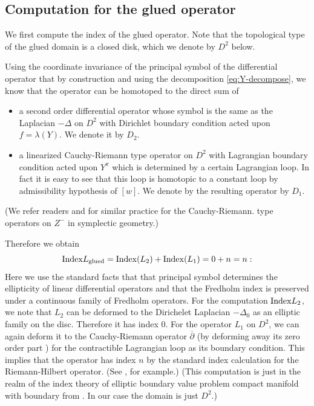 \documentclass[reqno]{amsart}
\theoremstyle{theorem}
\theoremstyle{definition}
\numberwithin{equation}{section}
\def\delbar{{\overline \partial}}
\def\delbar{{\overline \partial}}
\begin{document}
\subsection{Computation for the glued operator}

We first compute the index of the glued operator. Note that the topological type of
the glued domain is a closed disk, which we denote by $D^2$ below.

Using the coordinate invariance of the principal symbol of the differential operator
that by construction and using the decomposition \eqref{eq:Y-decompose}, we know that
the operator can be homotoped to the direct sum of
\begin{itemize}
\item a second order differential operator whose symbol is
the same as the Laplacian $-\Delta$ on $D^2$ with Dirichlet boundary condition acted upon
$f = \lambda(Y)$. We denote it by $D_2$.
\item a linearized Cauchy-Riemann type operator  on $D^2$ with Lagrangian boundary condition
acted upon $Y^\pi$ which is determined by a certain Lagrangian loop.
In fact it is easy to see that this loop is homotopic
to a constant loop by admissibility hypothesis of $[w]$.
We denote by the resulting operator by $D_1$.
\end{itemize}
(We refer readers \cite[Appendix]{oh:cag} and \cite{fooo:anchored} for similar practice
for the Cauchy-Riemann. type operators on $Z^-$ in symplectic geometry.)

Therefore we obtain
$$
{\rm Index }L_{\rm glued} = {\rm Index }(L_2) + {\rm Index }(L_1) = 0 + n = n:
$$
Here we use the standard facts that
that principal symbol determines the ellipticity of linear differential operators
and that the Fredholm index is preserved under a continuous family of
Fredholm operators. For the computation $ {\rm Index } L_2$, we note that $L_2$
can be deformed to the Dirichelet Laplacian $-\Delta_0$ as an elliptic family
on the disc. Therefore it has index 0. For the operator $L_1$ on $D^2$,
we can again deform it to  the Cauchy-Riemann operator $\delbar$
(by deforming away its zero order part ) for the contractible Lagrangian loop as its boundary
condition. This implies that the operator has index $n$ by the standard
index calculation for the Riemann-Hilbert operator. (See \cite{oh:kmj}, for example.)
(This computation is just in the realm of the index theory of elliptic boundary
value problem compact manifold with boundary from \cite{atiyah-bott}. In our case the domain
is just $D^2$.)
\end{document}
